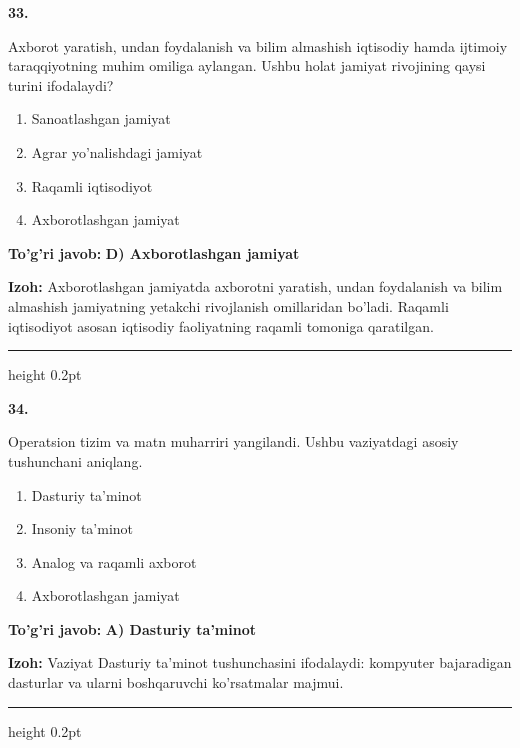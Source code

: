 \documentclass[10pt,a4paper,oneside]{article}
\begin{document}
\noindent\textbf{\color{ink}33.}
\par
Axborot yaratish, undan foydalanish va bilim almashish iqtisodiy hamda ijtimoiy taraqqiyotning muhim omiliga aylangan. Ushbu holat jamiyat rivojining qaysi turini ifodalaydi?
\begin{enumerate}[label=\Alph*),leftmargin=9mm]
\item Sanoatlashgan jamiyat
\item Agrar yo'nalishdagi jamiyat
\item Raqamli iqtisodiyot
\item Axborotlashgan jamiyat
\end{enumerate}
\begin{tcolorbox}[enhanced,breakable,colback=teal!4,colframe=teal!50!black,boxrule=0.5pt,arc=1.1mm,left=3mm,right=3mm,top=1.7mm,bottom=1.7mm,before skip=2mm,after skip=2mm]
\textbf{\color{teal}To'g'ri javob:} \textbf{D) Axborotlashgan jamiyat}
\par\smallskip
\textbf{Izoh:} Axborotlashgan jamiyatda axborotni yaratish, undan foydalanish va bilim almashish jamiyatning yetakchi rivojlanish omillaridan bo'ladi. Raqamli iqtisodiyot asosan iqtisodiy faoliyatning raqamli tomoniga qaratilgan.
\end{tcolorbox}
\vspace{2mm}\hrule height 0.2pt \vspace{3mm}

\noindent\textbf{\color{ink}34.}
\par
Operatsion tizim va matn muharriri yangilandi. Ushbu vaziyatdagi asosiy tushunchani aniqlang.
\begin{enumerate}[label=\Alph*),leftmargin=9mm]
\item Dasturiy ta'minot
\item Insoniy ta'minot
\item Analog va raqamli axborot
\item Axborotlashgan jamiyat
\end{enumerate}
\begin{tcolorbox}[enhanced,breakable,colback=teal!4,colframe=teal!50!black,boxrule=0.5pt,arc=1.1mm,left=3mm,right=3mm,top=1.7mm,bottom=1.7mm,before skip=2mm,after skip=2mm]
\textbf{\color{teal}To'g'ri javob:} \textbf{A) Dasturiy ta'minot}
\par\smallskip
\textbf{Izoh:} Vaziyat Dasturiy ta'minot tushunchasini ifodalaydi: kompyuter bajaradigan dasturlar va ularni boshqaruvchi ko'rsatmalar majmui.
\end{tcolorbox}
\vspace{2mm}\hrule height 0.2pt \vspace{3mm}
\end{document}
